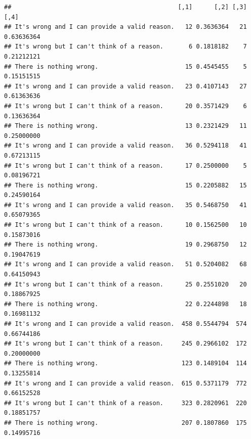 \documentclass[
  american,
  man,floatsintext]{apa7}
\begin{document}
\begin{verbatim}
##                                              [,1]      [,2] [,3]       [,4]
## It's wrong and I can provide a valid reason.   12 0.3636364   21 0.63636364
## It's wrong but I can't think of a reason.       6 0.1818182    7 0.21212121
## There is nothing wrong.                        15 0.4545455    5 0.15151515
## It's wrong and I can provide a valid reason.   23 0.4107143   27 0.61363636
## It's wrong but I can't think of a reason.      20 0.3571429    6 0.13636364
## There is nothing wrong.                        13 0.2321429   11 0.25000000
## It's wrong and I can provide a valid reason.   36 0.5294118   41 0.67213115
## It's wrong but I can't think of a reason.      17 0.2500000    5 0.08196721
## There is nothing wrong.                        15 0.2205882   15 0.24590164
## It's wrong and I can provide a valid reason.   35 0.5468750   41 0.65079365
## It's wrong but I can't think of a reason.      10 0.1562500   10 0.15873016
## There is nothing wrong.                        19 0.2968750   12 0.19047619
## It's wrong and I can provide a valid reason.   51 0.5204082   68 0.64150943
## It's wrong but I can't think of a reason.      25 0.2551020   20 0.18867925
## There is nothing wrong.                        22 0.2244898   18 0.16981132
## It's wrong and I can provide a valid reason.  458 0.5544794  574 0.66744186
## It's wrong but I can't think of a reason.     245 0.2966102  172 0.20000000
## There is nothing wrong.                       123 0.1489104  114 0.13255814
## It's wrong and I can provide a valid reason.  615 0.5371179  772 0.66152528
## It's wrong but I can't think of a reason.     323 0.2820961  220 0.18851757
## There is nothing wrong.                       207 0.1807860  175 0.14995716
\end{verbatim}
\end{document}
